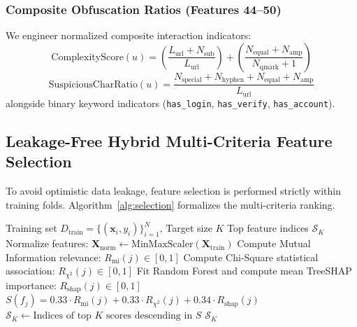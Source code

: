 \documentclass[conference]{IEEEtran}
\begin{document}
\subsubsection{Composite Obfuscation Ratios (Features 44--50)}
We engineer normalized composite interaction indicators:
\begin{equation}
\text{ComplexityScore}(u) = \left( \frac{L_{\text{url}} + N_{\text{sub}}}{L_{\text{url}}} \right) + \left( \frac{N_{\text{equal}} + N_{\text{amp}}}{N_{\text{qmark}} + 1} \right)
\end{equation}
\begin{equation}
\text{SuspiciousCharRatio}(u) = \frac{N_{\text{special}} + N_{\text{hyphen}} + N_{\text{equal}} + N_{\text{amp}}}{L_{\text{url}}}
\end{equation}
alongside binary keyword indicators (\texttt{has\_login}, \texttt{has\_verify}, \texttt{has\_account}).

\subsection{Leakage-Free Hybrid Multi-Criteria Feature Selection}
To avoid optimistic data leakage, feature selection is performed strictly within training folds. Algorithm~\ref{alg:selection} formalizes the multi-criteria ranking.

\begin{algorithm}[h]
\caption{Fold-Wise Hybrid Multi-Criteria Feature Selection}
\label{alg:selection}
\begin{algorithmic}[1]
\REQUIRE Training set $D_{\text{train}} = \{(\mathbf{x}_i, y_i)\}_{i=1}^N$, Target size $K$
\ENSURE Top feature indices $\mathcal{S}_K$
\STATE Normalize features: $\mathbf{X}_{\text{norm}} \leftarrow \text{MinMaxScaler}(\mathbf{X}_{\text{train}})$
\STATE Compute Mutual Information relevance: $R_{\text{mi}}(j) \in [0, 1]$
\STATE Compute Chi-Square statistical association: $R_{\chi^2}(j) \in [0, 1]$
\STATE Fit Random Forest and compute mean TreeSHAP importance: $R_{\text{shap}}(j) \in [0, 1]$
    \STATE $S(f_j) = 0.33 \cdot R_{\text{mi}}(j) + 0.33 \cdot R_{\chi^2}(j) + 0.34 \cdot R_{\text{shap}}(j)$
\ENDFOR
\STATE $\mathcal{S}_K \leftarrow \text{Indices of top } K \text{ scores descending in } S$
\RETURN $\mathcal{S}_K$
\end{algorithmic}
\end{algorithm}
\end{document}
